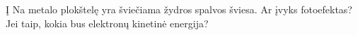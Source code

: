 \question Į Na metalo plokštelę yra šviečiama žydros spalvos šviesa. Ar įvyks fotoefektas? Jei taip, kokia bus elektronų kinetinė energija?